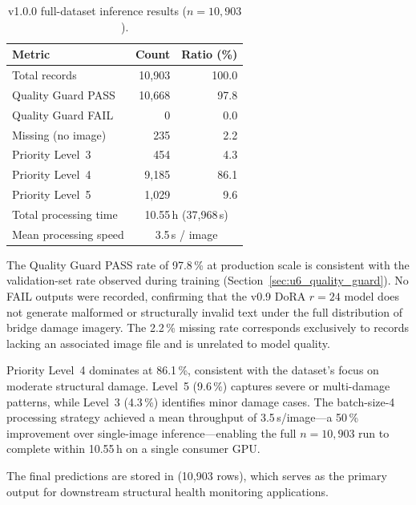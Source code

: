 \documentclass[onecolumn]{article}
\begin{document}
\begin{table}[H]
  \centering
  \caption{v1.0.0 full-dataset inference results ($n{=}10{,}903$).}
  \label{tab:u74_inference_results}
  \begin{tabular}{lrr}
    \toprule
    \textbf{Metric} & \textbf{Count} & \textbf{Ratio (\%)} \\
    \midrule
    Total records                & 10{,}903 & 100.0 \\
    \addlinespace
    Quality Guard PASS           & 10{,}668 &  97.8 \\
    Quality Guard FAIL           &       0  &   0.0 \\
    Missing (no image)           &     235  &   2.2 \\
    \addlinespace
    Priority Level~3             &     454  &   4.3 \\
    Priority Level~4             &   9{,}185 &  86.1 \\
    Priority Level~5             &   1{,}029 &   9.6 \\
    \addlinespace
    Total processing time        & \multicolumn{2}{c}{10.55\,h (37{,}968\,s)} \\
    Mean processing speed        & \multicolumn{2}{c}{3.5\,s / image} \\
    \bottomrule
  \end{tabular}
\end{table}

The Quality Guard PASS rate of 97.8\,\% at production scale
is consistent with the validation-set rate observed during training
(Section~\ref{sec:u6_quality_guard}).
No FAIL outputs were recorded, confirming that the v0.9 DoRA $r{=}24$ model
does not generate malformed or structurally invalid text under the full
distribution of bridge damage imagery.
The 2.2\,\% missing rate corresponds exclusively to records lacking an
associated image file and is unrelated to model quality.

Priority Level~4 dominates at 86.1\,\%, consistent with the dataset's
focus on moderate structural damage.
Level~5 (9.6\,\%) captures severe or multi-damage patterns,
while Level~3 (4.3\,\%) identifies minor damage cases.
The batch-size-4 processing strategy achieved a mean throughput of
3.5\,s/image---a 50\,\% improvement over single-image inference---enabling
the full $n{=}10{,}903$ run to complete within 10.55\,h on a single consumer GPU.

The final predictions are stored in
 (10{,}903 rows),
which serves as the primary output for downstream structural health
monitoring applications.
\end{document}
